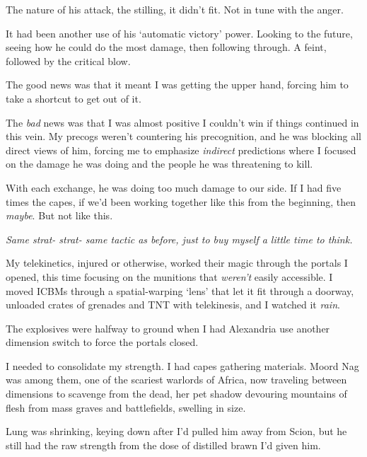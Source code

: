 The nature of his attack, the stilling, it didn't fit.  Not in tune with the anger.



It had been another use of his `automatic victory' power.  Looking to the future, seeing how he could do the most damage, then following through.  A feint, followed by the critical blow.



The good news was that it meant I was getting the upper hand, forcing him to take a shortcut to get out of it.



The \emph{bad} news was that I was almost positive I couldn't win if things continued in this vein.  My precogs weren't countering his precognition, and he was blocking all direct views of him, forcing me to emphasize \emph{indirect} predictions where I focused on the damage he was doing and the people he was threatening to kill.



With each exchange, he was doing too much damage to our side.  If I had five times the capes, if we'd been working together like this from the beginning, then \emph{maybe}.  But not like this.



\emph{Same strat- strat- same tactic as before, just to buy myself a little time to think.}



My telekinetics, injured or otherwise, worked their magic through the portals I opened, this time focusing on the munitions that \emph{weren't }easily accessible.  I moved ICBMs through a spatial-warping `lens' that let it fit through a doorway, unloaded crates of grenades and TNT with telekinesis, and I watched it \emph{rain}.



The explosives were halfway to ground when I had Alexandria use another dimension switch to force the portals closed.



I needed to consolidate my strength.  I had capes gathering materials.  Moord Nag was among them, one of the scariest warlords of Africa, now traveling between dimensions to scavenge from the dead, her pet shadow devouring mountains of flesh from mass graves and battlefields, swelling in size.



Lung was shrinking, keying down after I'd pulled him away from Scion, but he still had the raw strength from the dose of distilled brawn I'd given him.



